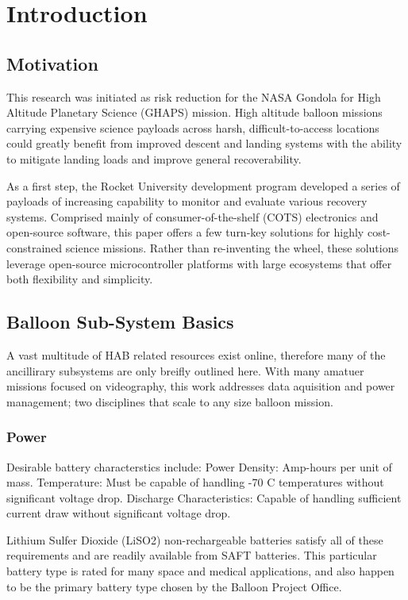 \documentclass[heading.tex]{subfiles}
\begin{document}

\section{Introduction}
\subsection{Motivation}
This research was initiated as risk reduction for the NASA
Gondola for High Altitude Planetary Science (GHAPS) mission.
High altitude balloon missions carrying expensive science payloads
across harsh, difficult-to-access locations could greatly benefit from
improved descent and landing systems with the ability to mitigate landing
loads and improve general recoverability.

As a first step, the Rocket University development program developed a series
of payloads of increasing capability to monitor and evaluate various recovery
systems. Comprised mainly of consumer-of-the-shelf (COTS) electronics and
open-source software, this paper offers a few turn-key solutions for highly
cost-constrained science missions. Rather than re-inventing the wheel, these
solutions leverage open-source microcontroller platforms with large ecosystems
that offer both flexibility and simplicity.


\subsection{Balloon Sub-System Basics}

A vast multitude of HAB related resources exist online, therefore many of the
ancillirary subsystems are only breifly outlined here. With many amatuer missions
focused on videography, this work addresses data aquisition and power management;
two disciplines that scale to any size balloon mission.

\subsubsection{Power}

Desirable battery characterstics include:
Power Density: Amp-hours per unit of mass.
Temperature: Must be capable of handling -70 \deg C temperatures without
significant voltage drop.
Discharge Characteristics: Capable of handling sufficient current draw without
significant voltage drop.

Lithium Sulfer Dioxide (LiSO2) non-rechargeable batteries satisfy all of these
requirements and are readily available from SAFT batteries.
This particular battery type is rated for many space and medical applications,
and also happen to be the primary battery type chosen by the Balloon Project Office.
\end{document}
